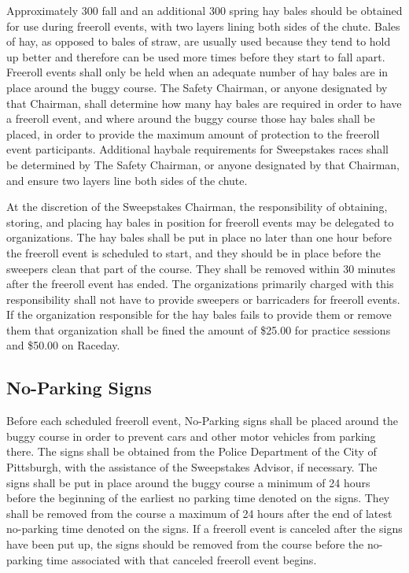 	Approximately 300 fall and an additional 300 spring hay bales should be obtained for use during freeroll events, with two layers lining both sides of the chute. Bales of hay, as opposed to bales of straw, are usually used because they tend to hold up better and therefore can be used more times before they start to fall apart. Freeroll events shall only be held when an adequate number of hay bales are in place around the buggy course. The Safety Chairman, or anyone designated by that Chairman, shall determine how many hay bales are required in order to have a freeroll event, and where around the buggy course those hay bales shall be placed, in order to provide the maximum amount of protection to the freeroll event participants. Additional haybale requirements for Sweepstakes races shall be determined by The Safety Chairman, or anyone designated by that Chairman, and ensure two layers line both sides of the chute.

	At the discretion of the Sweepstakes Chairman, the responsibility of obtaining, storing, and placing hay bales in position for freeroll events may be delegated to organizations. The hay bales shall be put in place no later than one hour before the freeroll event is scheduled to start, and they should be in place before the sweepers clean that part of the course. They shall be removed within 30 minutes after the freeroll event has ended. The organizations primarily charged with this responsibility shall not have to provide sweepers or barricaders for freeroll events. If the organization responsible for the hay bales fails to provide them or remove them that organization shall be fined the amount of \$25.00 for practice sessions and \$50.00 on Raceday.
	
	
\subsection{No-Parking Signs}
\label{subsec:NoParking}

	Before each scheduled freeroll event, No-Parking signs shall be placed around the buggy course in order to prevent cars and other motor vehicles from parking there. The signs shall be obtained from the Police Department of the City of Pittsburgh, with the assistance of the Sweepstakes Advisor, if necessary. The signs shall be put in place around the buggy course a minimum of 24 hours before the beginning of the earliest no parking time denoted on the signs. They shall be removed from the course a maximum of 24 hours after the end of latest no-parking time denoted on the signs. If a freeroll event is canceled after the signs have been put up, the signs should be removed from the course before the no-parking time associated with that canceled freeroll event begins.

